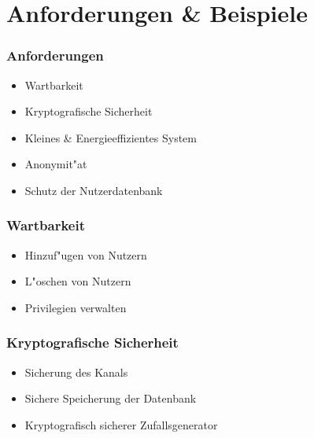 \section{Anforderungen \& Beispiele}
\begin{frame}
	\frametitle{Anforderungen}
	\begin{itemize}
		\item<2-> Wartbarkeit
		\item<3-> Kryptografische Sicherheit
		\item<5-> Kleines \& Energieeffizientes System
		\item<6-> Anonymit"at
		\item<7-> Schutz der Nutzerdatenbank
	\end{itemize}
\end{frame}

\begin{frame}
	\frametitle{Wartbarkeit}
	\begin{itemize}
		\item<2-> Hinzuf"ugen von Nutzern
		\item<3-> L"oschen von Nutzern
		\item<4-> Privilegien verwalten
	\end{itemize}
\end{frame}
\begin{frame}
	\frametitle{Kryptografische Sicherheit}
	\begin{itemize}
		\item<2-> Sicherung des Kanals
		\item<3-> Sichere Speicherung der Datenbank
		\item<4-> Kryptografisch sicherer Zufallsgenerator
	\end{itemize}
\end{frame}


